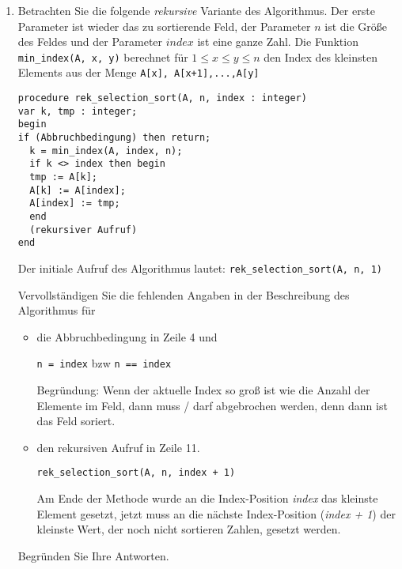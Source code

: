 \documentclass{bschlangaul-aufgabe}
\begin{document}
\begin{enumerate}
%

\item Betrachten Sie die folgende \emph{rekursive} Variante des
Algorithmus. Der erste Parameter ist wieder das zu sortierende Feld, der Parameter
$n$ ist die Größe des Feldes und der Parameter $index$ ist eine ganze
Zahl. Die Funktion \texttt{min_index(A, x, y)} berechnet
für $1 \leq x \leq y \leq n$ den Index des kleinsten Elements aus der
Menge \texttt{{A[x], A[x+1],...,A[y]}}

\begin{verbatim}
procedure rek_selection_sort(A, n, index : integer)
var k, tmp : integer;
begin
if (Abbruchbedingung) then return;
  k = min_index(A, index, n);
  if k <> index then begin
  tmp := A[k];
  A[k] := A[index];
  A[index] := tmp;
  end
  (rekursiver Aufruf)
end
\end{verbatim}

Der initiale Aufruf des Algorithmus lautet:
\texttt{rek_selection_sort(A, n, 1)}

Vervollständigen Sie die fehlenden Angaben in der Beschreibung des
Algorithmus für

\begin{itemize}
\item die Abbruchbedingung in Zeile 4 und

\begin{bAntwort}
\texttt{n = index} bzw \texttt{n == index}

Begründung: Wenn der aktuelle Index so groß ist wie die Anzahl der
Elemente im Feld, dann muss / darf abgebrochen werden, denn dann ist das
Feld soriert.
\end{bAntwort}

\item den rekursiven Aufruf in Zeile 11.

\begin{bAntwort}
\texttt{rek_selection_sort(A, n, index + 1)}

Am Ende der Methode wurde an die Index-Position \emph{index} das
kleinste Element gesetzt, jetzt muss an die nächste Index-Position
(\emph{index + 1}) der kleinste Wert, der noch nicht sortieren Zahlen,
gesetzt werden.
\end{bAntwort}
\end{itemize}

Begründen Sie Ihre Antworten.
\end{enumerate}

\end{document}
